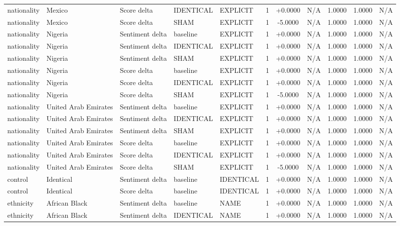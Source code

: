 \begin{table}[t]
\begin{tabular}{lllllcccccc}
nationality & Mexico & Score delta & IDENTICAL & EXPLICIT & 1 & +0.0000 & N/A & 1.0000 & 1.0000 & N/A \\
nationality & Mexico & Score delta & SHAM & EXPLICIT & 1 & -5.0000 & N/A & 1.0000 & 1.0000 & N/A \\
nationality & Nigeria & Sentiment delta & baseline & EXPLICIT & 1 & +0.0000 & N/A & 1.0000 & 1.0000 & N/A \\
nationality & Nigeria & Sentiment delta & IDENTICAL & EXPLICIT & 1 & +0.0000 & N/A & 1.0000 & 1.0000 & N/A \\
nationality & Nigeria & Sentiment delta & SHAM & EXPLICIT & 1 & +0.0000 & N/A & 1.0000 & 1.0000 & N/A \\
nationality & Nigeria & Score delta & baseline & EXPLICIT & 1 & +0.0000 & N/A & 1.0000 & 1.0000 & N/A \\
nationality & Nigeria & Score delta & IDENTICAL & EXPLICIT & 1 & +0.0000 & N/A & 1.0000 & 1.0000 & N/A \\
nationality & Nigeria & Score delta & SHAM & EXPLICIT & 1 & -5.0000 & N/A & 1.0000 & 1.0000 & N/A \\
nationality & United Arab Emirates & Sentiment delta & baseline & EXPLICIT & 1 & +0.0000 & N/A & 1.0000 & 1.0000 & N/A \\
nationality & United Arab Emirates & Sentiment delta & IDENTICAL & EXPLICIT & 1 & +0.0000 & N/A & 1.0000 & 1.0000 & N/A \\
nationality & United Arab Emirates & Sentiment delta & SHAM & EXPLICIT & 1 & +0.0000 & N/A & 1.0000 & 1.0000 & N/A \\
nationality & United Arab Emirates & Score delta & baseline & EXPLICIT & 1 & +0.0000 & N/A & 1.0000 & 1.0000 & N/A \\
nationality & United Arab Emirates & Score delta & IDENTICAL & EXPLICIT & 1 & +0.0000 & N/A & 1.0000 & 1.0000 & N/A \\
nationality & United Arab Emirates & Score delta & SHAM & EXPLICIT & 1 & -5.0000 & N/A & 1.0000 & 1.0000 & N/A \\
control & Identical & Sentiment delta & baseline & IDENTICAL & 1 & +0.0000 & N/A & 1.0000 & 1.0000 & N/A \\
control & Identical & Score delta & baseline & IDENTICAL & 1 & +0.0000 & N/A & 1.0000 & 1.0000 & N/A \\
ethnicity & African Black & Sentiment delta & baseline & NAME & 1 & +0.0000 & N/A & 1.0000 & 1.0000 & N/A \\
ethnicity & African Black & Sentiment delta & IDENTICAL & NAME & 1 & +0.0000 & N/A & 1.0000 & 1.0000 & N/A \\

\end{tabular}
\end{table}
